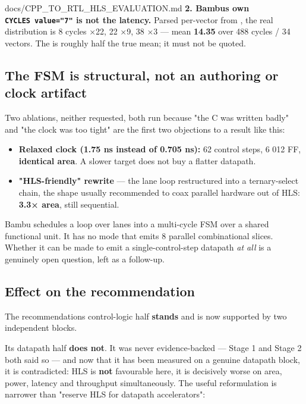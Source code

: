 \begin{relocated}{docs/CPP_TO_RTL_HLS_EVALUATION.md}
\textbf{2. Bambu\textquotesingle s own
\texttt{CYCLES\ value=\allowbreak{}"7"} is not the latency.} Parsed
per-vector from , the real distribution is 8 cycles
×22, 22 ×9, 38 ×3 --- mean \textbf{14.35} over 488 cycles / 34 vectors.
The  is roughly half the true mean; it must not be quoted.

\subsection{The FSM is structural, not an authoring or clock artifact}\label{tm:dec:cpp-to-rtl-hls-evaluation:the-fsm-is-structural-not-an-authoring-or-clock-artifact}

Two ablations, neither requested, both run because "the C was written
badly" and "the clock was too tight" are the first two objections to a
result like this:

\begin{itemize}
\tightlist
\item
  \textbf{Relaxed clock (1.75 ns instead of 0.705 ns):} 62 control
  steps, 6 012 FF, \textbf{identical area}. A slower target does not buy
  a flatter datapath.
\item
  \textbf{"HLS-friendly" rewrite} --- the lane loop restructured into a
  ternary-select chain, the shape usually recommended to coax parallel
  hardware out of HLS: \textbf{3.3× area}, still sequential.
\end{itemize}

Bambu schedules a loop over lanes into a multi-cycle FSM over a shared
functional unit. It has no mode that emits 8 parallel combinational
slices. Whether it can be made to emit a single-control-step datapath
\emph{at all} is a genuinely open question, left as a follow-up.

\subsection{Effect on the recommendation}\label{tm:dec:cpp-to-rtl-hls-evaluation:effect-on-the-recommendation-1}

The recommendation\textquotesingle s control-logic half \textbf{stands}
and is now supported by two independent blocks.

Its datapath half \textbf{does not}. It was never evidence-backed ---
Stage 1 and Stage 2 both said so --- and now that it has been measured
on a genuine datapath block, it is contradicted: HLS is \textbf{not}
favourable here, it is decisively worse on area, power, latency and
throughput simultaneously. The useful reformulation is narrower than
"reserve HLS for datapath accelerators":


\end{relocated}
